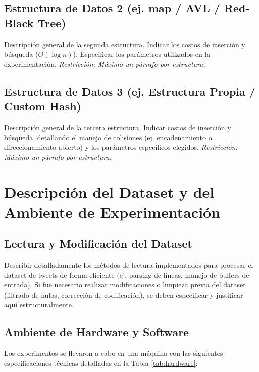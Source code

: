 \documentclass[11pt,letterpaper]{article}
\begin{document}
\subsection{Estructura de Datos 2 (ej. map / AVL / Red-Black Tree)}
Descripción general de la segunda estructura. Indicar los costos de inserción y búsqueda ($O(\log n)$). Especificar los parámetros utilizados en la experimentación. \textit{Restricción: Máximo un párrafo por estructura.}

\subsection{Estructura de Datos 3 (ej. Estructura Propia / Custom Hash)}
Descripción general de la tercera estructura. Indicar costos de inserción y búsqueda, detallando el manejo de colisiones (ej. encadenamiento o direccionamiento abierto) y los parámetros específicos elegidos. \textit{Restricción: Máximo un párrafo por estructura.}


\section{Descripción del Dataset y del Ambiente de Experimentación}
\label{sec:ambiente}

\subsection{Lectura y Modificación del Dataset}
Describir detalladamente los métodos de lectura implementados para procesar el dataset de tweets de forma eficiente (ej. parsing de líneas, manejo de buffers de entrada). Si fue necesario realizar modificaciones o limpieza previa del dataset (filtrado de nulos, corrección de codificación), se deben especificar y justificar aquí estructuralmente.

\subsection{Ambiente de Hardware y Software}
Los experimentos se llevaron a cabo en una máquina con las siguientes especificaciones técnicas detalladas en la Tabla \ref{tab:hardware}:
\end{document}
